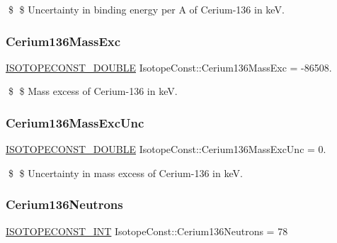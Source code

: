 \$ \$ Uncertainty in binding energy per A of Cerium-\/136 in keV. \mbox{\label{group___isotope_const-_cerium-_ce136_ga48026dc3c5a30626f499dc67d2099ab9}} 
\subsubsection{\texorpdfstring{Cerium136\+Mass\+Exc}{Cerium136MassExc}}
{\footnotesize\ttfamily \mbox{\hyperlink{group___isotope_const-_macros_ga8f45a7272ce02c0b4c65c44636ed719a}{I\+S\+O\+T\+O\+P\+E\+C\+O\+N\+S\+T\+\_\+\+D\+O\+U\+B\+LE}} Isotope\+Const\+::\+Cerium136\+Mass\+Exc = -\/86508.}

\$ \$ Mass excess of Cerium-\/136 in keV. \mbox{\label{group___isotope_const-_cerium-_ce136_ga9c636b2458f0c0c230827b480b84a7e3}} 
\subsubsection{\texorpdfstring{Cerium136\+Mass\+Exc\+Unc}{Cerium136MassExcUnc}}
{\footnotesize\ttfamily \mbox{\hyperlink{group___isotope_const-_macros_ga8f45a7272ce02c0b4c65c44636ed719a}{I\+S\+O\+T\+O\+P\+E\+C\+O\+N\+S\+T\+\_\+\+D\+O\+U\+B\+LE}} Isotope\+Const\+::\+Cerium136\+Mass\+Exc\+Unc = 0.}

\$ \$ Uncertainty in mass excess of Cerium-\/136 in keV. \mbox{\label{group___isotope_const-_cerium-_ce136_gabea84736787af41c9f4c92542b025fa7}} 
\subsubsection{\texorpdfstring{Cerium136\+Neutrons}{Cerium136Neutrons}}
{\footnotesize\ttfamily \mbox{\hyperlink{group___isotope_const-_macros_ga5f18360b3e99483a35c32d789e62621c}{I\+S\+O\+T\+O\+P\+E\+C\+O\+N\+S\+T\+\_\+\+I\+NT}} Isotope\+Const\+::\+Cerium136\+Neutrons = 78}

